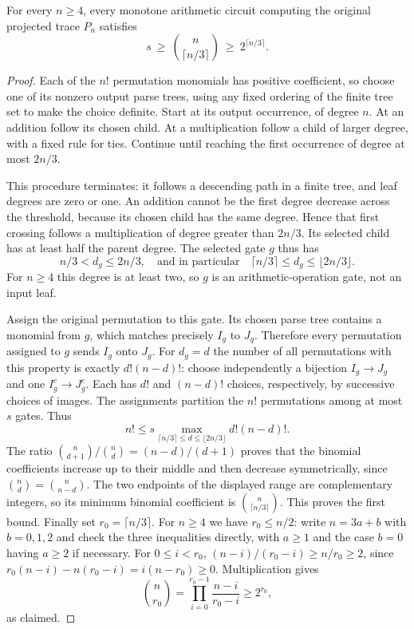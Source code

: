 \begin{theorem}\label{thm:per-monotone-lower-bound}
For every $n\ge4$, every monotone arithmetic circuit computing
the original projected trace $P_n$ satisfies
\[
 s\ \ge\ \binom n{\lceil n/3\rceil}
       \ \ge\ 2^{\lceil n/3\rceil}.
\]
\end{theorem}
\begin{proof}
Each of the $n!$ permutation monomials has positive coefficient,
so choose one of its nonzero output parse trees, using any fixed
ordering of the finite tree set to make the choice definite.
Start at its output occurrence, of degree $n$. At an addition
follow its chosen child. At a multiplication follow a child of
larger degree, with a fixed rule for ties. Continue until reaching
the first occurrence of degree at most $2n/3$.

This procedure terminates: it follows a descending path in a finite
tree, and leaf degrees are zero or one. An addition cannot be the
first degree decrease across the threshold, because its chosen
child has the same degree. Hence that first crossing follows a
multiplication of degree greater than $2n/3$. Its selected child
has at least half the parent degree. The selected gate $g$ thus has
\[
 n/3<d_g\le2n/3,
 \quad\text{and in particular}\quad
 \lceil n/3\rceil\le d_g\le\lfloor2n/3\rfloor.
\]
For $n\ge4$ this degree is at least two, so $g$ is an
arithmetic-operation gate, not an input leaf.

Assign the original permutation to this gate. Its chosen parse tree
contains a monomial from $g$, which matches precisely $I_g$ to $J_g$.
Therefore every permutation assigned to $g$ sends $I_g$ onto $J_g$.
For $d_g=d$ the number of all permutations with this property is
exactly $d!(n-d)!$: choose independently a bijection $I_g\to J_g$
and one $I_g^c\to J_g^c$. Each has $d!$ and $(n-d)!$ choices,
respectively, by successive choices of images. The assignments
partition the $n!$ permutations among at most $s$ gates. Thus
\[
 n!\le s\max_{\lceil n/3\rceil\le d\le\lfloor2n/3\rfloor}
                         d!(n-d)!.
\]
The ratio $\binom n{d+1}/\binom nd=(n-d)/(d+1)$ proves that
the binomial coefficients increase up to their middle and then
decrease symmetrically, since $\binom nd=\binom n{n-d}$.
The two endpoints of the displayed range are complementary
integers, so its minimum binomial coefficient is
$\binom n{\lceil n/3\rceil}$. This proves the first bound.
Finally set $r_0=\lceil n/3\rceil$. For $n\ge4$ we have
$r_0\le n/2$: write $n=3a+b$ with $b=0,1,2$ and check the
three inequalities directly, with $a\ge1$ and the case $b=0$
having $a\ge2$ if necessary. For $0\le i<r_0$,
$(n-i)/(r_0-i)\ge n/r_0\ge2$, since
$r_0(n-i)-n(r_0-i)=i(n-r_0)\ge0$. Multiplication gives
\[
 \binom n{r_0}
 =\prod_{i=0}^{r_0-1}\frac{n-i}{r_0-i}
 \ge2^{r_0},
\]
as claimed.
\end{proof}

